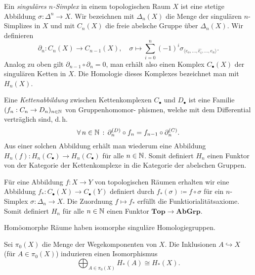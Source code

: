 \documentclass{cheat-sheet}
\newcommand{\angles}[1]{\langle #1 \rangle}
\newcommand{\CC}[1]{{#1}_{\bullet}} %
\newcommand{\Top}{\mathbf{Top}} %
\newcommand{\AbGrp}{\mathbf{AbGrp}} %
\begin{document}
\begin{defn}
  Ein \emph{singuläres $n$-Simplex} in einem topologischen Raum $X$ ist eine stetige Abbildung $\sigma : \Delta^n \to X$. Wir bezeichnen mit $\Delta_n(X)$ die Menge der singulären $n$-Simplizes in $X$ und mit $C_n(X)$ die freie abelsche Gruppe über $\Delta_n(X)$. Wir definieren
  \[
    \partial_n : C_n(X) \to C_{n-1}(X), \quad
    \sigma \mapsto \sum_{i=0}^n (-1)^i \sigma_{\angles{e_o,...,\hat{e_i},...,e_n}}.
  \]
  Analog zu oben gilt $\partial_{n-1} \circ \partial_n = 0$, man erhält also einen Komplex $\CC{C}(X)$ der singulären Ketten in $X$. Die Homologie dieses Komplexes bezeichnet man mit $H_n(X)$.
\end{defn}

\begin{defn}
  Eine \emph{Kettenabbildung} zwischen Kettenkomplexen $\CC{C}$ und $\CC{D}$ ist eine Familie $(f_n : C_n \to D_n)_{n \in \mathbb{N}}$ von Gruppenhomomor- phismen, welche mit dem Differential verträglich sind, d.\,h.
  \[ \forall \, {n \in \mathbb{N}} \,:\, \partial_n^{(D)} \circ f_n = f_{n-1} \circ \partial_n^{(C)}. \]
  Aus einer solchen Abbildung erhält man wiederum eine Abbildung $H_n(f) : H_n(\CC{C}) \to H_n(\CC{C})$ für alle $n \in \mathbb{N}$. Somit definiert $H_n$ einen Funktor von der Kategorie der Kettenkomplexe in die Kategorie der abelschen Gruppen.
\end{defn}


\begin{defn}
  Für eine Abbildung $f : X \to Y$ von topologischen Räumen erhalten wir eine Abbildung $f_* : \CC{C}(X) \to \CC{C}(Y)$ definiert durch $f_*(\sigma) \coloneqq f \circ \sigma$ für ein $n$-Simplex $\sigma : \Delta_n \to X$. Die Zuordnung $f \mapsto f_*$ erfüllt die Funktiorialitätsaxiome. Somit definiert $H_n$ für alle $n \in \mathbb{N}$ einen Funktor $\Top \to \AbGrp$.
\end{defn}

\begin{kor}
  Homöomorphe Räume haben isomorphe singuläre Homologiegruppen.
\end{kor}


\begin{prop}
  Sei $\pi_0(X)$ die Menge der Wegekomponenten von $X$. Die Inklusionen $A \hookrightarrow X$ (für $A \in \pi_0(X)$) induzieren einen Isomorphismus
  \[ \bigoplus_{A \in \pi_0(X)} H_*(A) \cong H_*(X). \]
\end{prop}
\end{document}
